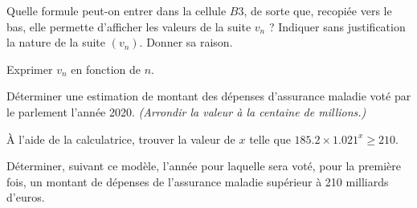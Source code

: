 \begin{questions}
	\setcounter{question}{1}
	\question Quelle formule peut-on entrer dans la cellule $B3$, de sorte que, recopiée vers le bas, elle permette d'afficher les valeurs de la suite $v_n$ ?
	\question Indiquer sans justification la nature de la suite $(v_n)$. Donner sa raison.
	
	\question Exprimer $v_n$ en fonction de $n$.
	
	\question Déterminer une estimation de montant des dépenses d'assurance maladie voté par le parlement l'année 2020. \emph{(Arrondir la valeur à la centaine de millions.)}
	
	\question \`A l'aide de la calculatrice, trouver la valeur de $x$ telle que $\num{185.2} \times \num{1.021}^x \ge \num{210}$.
	
	\question Déterminer, suivant ce modèle, l'année pour laquelle sera voté, pour la première fois, un montant de dépenses de l'assurance maladie supérieur à 210 milliards d'euros. 
\end{questions}